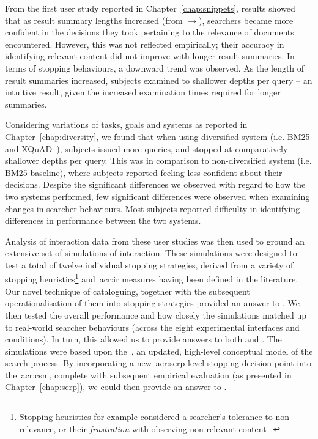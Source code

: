 From the first user study reported in Chapter~\ref{chap:snippets}, results showed that as result summary lengths increased (from $\rightarrow$), searchers became more confident in the decisions they took pertaining to the relevance of documents encountered. However, this was not reflected empirically; their accuracy in identifying relevant content did not improve with longer result summaries. In terms of stopping behaviours, a downward trend was observed. As the length of result summaries increased, subjects examined to shallower depths per query -- an intuitive result, given the increased examination times required for longer summaries.

Considering variations of tasks, goals and systems as reported in Chapter~\ref{chap:diversity}, we found that when using diversified system  (i.e. BM25 and XQuAD~\citep{santos2010query_reformulations_diversification}), subjects issued more queries, and stopped at comparatively shallower depths per query. This was in comparison to non-diversified system  (i.e. BM25 baseline), where subjects reported feeling less confident about their decisions. Despite the significant differences we observed with regard to how the two systems performed, few significant differences were observed when examining changes in searcher behaviours. Most subjects reported difficulty in identifying differences in performance between the two systems.

Analysis of interaction data from these user studies was then used to ground an extensive set of simulations of interaction. These simulations were designed to test a total of twelve individual stopping strategies, derived from a variety of stopping heuristics\footnote{Stopping heuristics for example considered a searcher's tolerance to non-relevance, or their \emph{frustration} with observing non-relevant content~\citep{kraft1979stopping_rules}.} and~\gls{acr:ir} measures having been defined in the literature. Our novel technique of cataloguing, together with the subsequent operationalisation of them into stopping strategies provided an answer to . We then tested the overall performance and how closely the simulations matched up to real-world searcher behaviours (across the eight experimental interfaces and conditions). In turn, this allowed us to provide answers to both  and . The simulations were based upon the~, an updated, high-level conceptual model of the search process. By incorporating a new~\gls{acr:serp} level stopping decision point into the~\gls{acr:csm}, complete with subsequent empirical evaluation (as presented in Chapter~\ref{chap:serp}), we could then provide an answer to .

